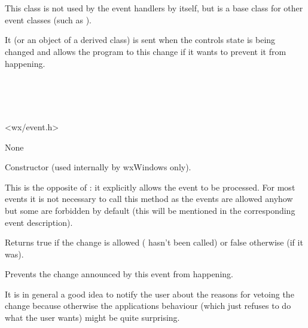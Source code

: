 \section{}\label{wxnotifyevent}

This class is not used by the event handlers by itself, but is a base class
for other event classes (such as ).

It (or an object of a derived class) is sent when the controls state is being
changed and allows the program to  this
change if it wants to prevent it from happening.


\\
\\
\\


<wx/event.h>


None




\label{wxnotifyeventconstr}


Constructor (used internally by wxWindows only).

\label{wxnotifyeventallow}


This is the opposite of : it explicitly
allows the event to be processed. For most events it is not necessary to call
this method as the events are allowed anyhow but some are forbidden by default
(this will be mentioned in the corresponding event description).

\label{wxnotifyeventisallowed}


Returns true if the change is allowed ( 
hasn't been called) or false otherwise (if it was).

\label{wxnotifyeventveto}


Prevents the change announced by this event from happening.

It is in general a good idea to notify the user about the reasons for vetoing
the change because otherwise the applications behaviour (which just refuses to
do what the user wants) might be quite surprising.

